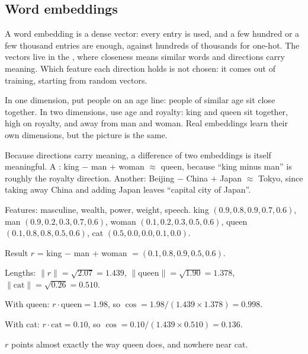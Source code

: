 \subsection*{Word embeddings}

\begin{definition}
A word embedding is a dense vector: every entry is used, and a few hundred or a few thousand entries are enough, against hundreds of thousands for one-hot. The vectors live in the , where closeness means similar words and directions carry meaning. Which feature each direction holds is not chosen: it comes out of training, starting from random vectors.
\end{definition}

\begin{example}
In one dimension, put people on an age line: people of similar age sit close together. In two dimensions, use age and royalty: king and queen sit together, high on royalty, and away from man and woman. Real embeddings learn their own dimensions, but the picture is the same.
\end{example}

\begin{definition}
Because directions carry meaning, a difference of two embeddings is itself meaningful. A : king $-$ man $+$ woman $\approx$ queen, because ``king minus man'' is roughly the royalty direction. Another: Beijing $-$ China $+$ Japan $\approx$ Tokyo, since taking away China and adding Japan leaves ``capital city of Japan''.
\end{definition}

\begin{example}
Features: masculine, wealth, power, weight, speech.
king $(0.9, 0.8, 0.9, 0.7, 0.6)$, man $(0.9, 0.2, 0.3, 0.7, 0.6)$, woman $(0.1, 0.2, 0.3, 0.5, 0.6)$, queen $(0.1, 0.8, 0.8, 0.5, 0.6)$, cat $(0.5, 0.0, 0.0, 0.1, 0.0)$.
\begin{steps}
  \item Result $r$ = king $-$ man $+$ woman $= (0.1, 0.8, 0.9, 0.5, 0.6)$.
  \item Lengths: $\lVert r\rVert = \sqrt{2.07} = 1.439$, $\lVert\text{queen}\rVert = \sqrt{1.90} = 1.378$, $\lVert\text{cat}\rVert = \sqrt{0.26} = 0.510$.
  \item With queen: $r\cdot\text{queen} = 1.98$, so $\cos = 1.98/(1.439 \times 1.378) = 0.998$.
  \item With cat: $r\cdot\text{cat} = 0.10$, so $\cos = 0.10/(1.439 \times 0.510) = 0.136$.
  \item $r$ points almost exactly the way queen does, and nowhere near cat.
\end{steps}
\end{example}

